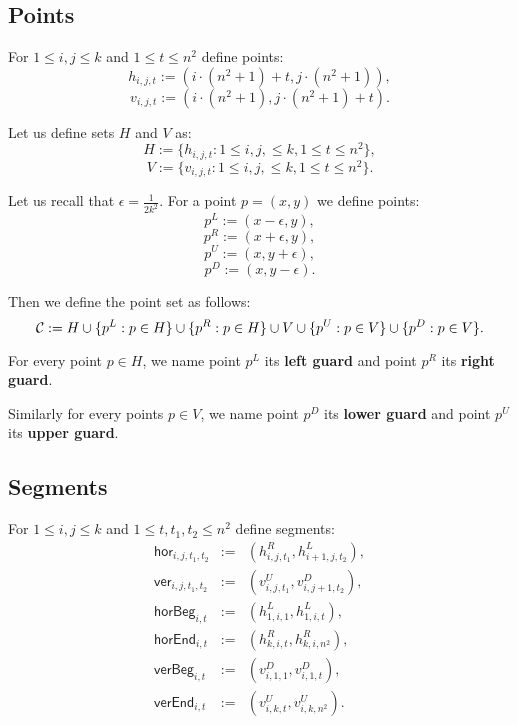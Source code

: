 \subsection{Points}

For $1 \le i,j \le k$ and $1 \le t \le n^2$ define points:
	$$h_{i, j, t} := (i \cdot (n^2+1) + t, j \cdot (n^2+1)),$$
	$$v_{i, j, t} := (i \cdot (n^2+1), j \cdot (n^2+1) + t).$$
	
Let us define sets $H$ and $V$ as:
$$H := \{h_{i, j, t} : 1 \le i, j, \le k, 1 \le t \le n^2\},$$
$$V := \{v_{i, j, t} : 1 \le i, j, \le k, 1 \le t \le n^2\}.$$
	
Let us recall that $\epsilon = \frac{1}{2k^2}$.
For a point $p = (x, y)$ we define points:
$$p^{L} := (x - \epsilon, y),$$
$$p^{R} := (x + \epsilon, y),$$
$$p^{U} := (x, y + \epsilon),$$
$$p^{D} := (x, y - \epsilon).$$

Then we define the point set as follows:
$$\mathcal{C} := H \cup \{p^L : p \in H\} \cup \{p^R : p \in H\}
\cup V \cup \{p^U : p \in V\} \cup \{p^D : p \in V\}.$$

\begin{defi}
	\label{guard_def}
	For every point $p \in H$, we name point $p^L$ its \textbf{left guard}
	and point $p^R$ its \textbf{right guard}.
	
	Similarly for every points $p \in V$, we name point $p^D$ its \textbf{lower guard}
	and point $p^U$ its \textbf{upper guard}.
\end{defi}

\subsection{Segments}
\newcommand{\hor}[4]{\mathsf{hor}_{#1,#2,#3,#4}}
\newcommand{\ver}[4]{\mathsf{ver}_{#1,#2,#3,#4}}
\newcommand{\horbeg}[2]{\mathsf{horBeg}_{#1,#2}}
\newcommand{\verbeg}[2]{\mathsf{verBeg}_{#1,#2}}
\newcommand{\horend}[2]{\mathsf{horEnd}_{#1,#2}}
\newcommand{\verend}[2]{\mathsf{verEnd}_{#1,#2}}

For $1 \le i,j \le k$ and $1 \le t, t_1, t_2 \le n^2$ define segments:
\begin{eqnarray*}
\hor{i}{j}{t_1}{t_2} & := & (h^R_{i,j,t_1}, h^L_{i+1, j, t_2}), \\
\ver{i}{j}{t_1}{t_2} & := & (v^U_{i,j,t_1}, v^D_{i, j+1, t_2}), \\
\horbeg{i}{t} & := & (h^L_{1, i, 1}, h^L_{1, i, t}), \\
\horend{i}{t} & := & (h^R_{k, i, t}, h^R_{k, i, n^2}), \\
\verbeg{i}{t} & := & (v^D_{i, 1, 1}, v^D_{i, 1, t}), \\
\verend{i}{t} & := & (v^U_{i, k, t}, v^U_{i, k, n^2}). \\
\end{eqnarray*}

